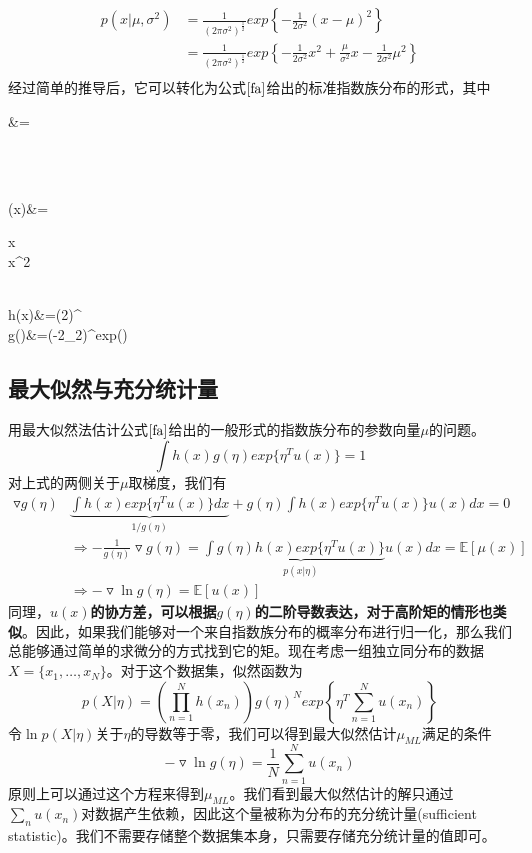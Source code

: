 \begin{enumerate}
\begin{equation}
\begin{aligned}
		p(x|\mu,\sigma^2)&=\frac{1}{(2\pi\sigma^2)^{\frac{1}{2}}}exp\left\{-\frac{1}{2\sigma^2}(x-\mu)^2 \right\}\\
		&=\frac{1}{(2\pi\sigma^2)^{\frac{1}{2}}}exp\left\{-\frac{1}{2\sigma^2}x^2+\frac{\mu}{\sigma^2}x-\frac{1}{2\sigma^2}\mu^2 \right\}\\
		\end{aligned}
	\end{equation}
	经过简单的推导后，它可以转化为公式$\ref{fa}$给出的标准指数族分布的形式，其中
	\begin{flalign}
		\eta&=\begin{pmatrix}
		\\
		\end{pmatrix}\\
		\mu(x)&=\begin{pmatrix}
		x\\x^2
		\end{pmatrix}\\
		h(x)&=(2\pi)^{}\\
		g(\eta)&=(-2\eta_2)^{}exp\left(\right)
	\end{flalign}
\end{enumerate}
\subsection*{最大似然与充分统计量}
用最大似然法估计公式$\ref{fa}$给出的一般形式的指数族分布的参数向量$\mu$的问题。
\begin{equation}
	\int h(x)g(\eta)exp\{\eta^Tu(x)\}=1
\end{equation}
对上式的两侧关于$\mu$取梯度，我们有
\begin{equation}
	\begin{aligned}
	\triangledown g(\eta)&\underbrace{\int h(x)exp\{\eta^Tu(x) \}dx}_{1/g(\eta)}+g(\eta)\int h(x)exp\{\eta^Tu(x) \}u(x)dx=0
	\\
	&\Rightarrow -\frac{1}{g(\eta)}\triangledown g(\eta)=\int \underbrace{g(\eta) h(x)exp\{\eta^Tu(x) \}}_{p(x|\eta)}u(x)dx=\mathbb{E}[\mu(x)]\\
	&\Rightarrow -\triangledown \ln g(\eta)=\mathbb{E}[u(x)]
	\end{aligned}
\end{equation}
同理，\textbf{$u(x)$的协方差，可以根据$g(\eta)$的二阶导数表达，对于高阶矩的情形也类似}。因此，如果我们能够对一个来自指数族分布的概率分布进行归一化，那么我们总能够通过简单的求微分的方式找到它的矩。现在考虑一组独立同分布的数据$X=\{x_1,\dots,x_N \}$。对于这个数据集，似然函数为
\begin{equation}
	p(X|\eta)=\left(\prod_{n=1}^{N}h(x_n) \right)g(\eta )^Nexp\left\{\eta^T\sum_{n=1}^{N}u(x_n) \right\}
\end{equation}
令$\ln p(X|\eta)$关于$\eta$的导数等于零，我们可以得到最大似然估计$\mu_{ML}$满足的条件
\begin{equation}
	-\triangledown \ln g(\eta)=\frac{1}{N}\sum_{n=1}^{N}u(x_n)
\end{equation}
原则上可以通过这个方程来得到$\mu_{ML}$。我们看到最大似然估计的解只通过$\sum_{n}u(x_n)$对数据产生依赖，因此这个量被称为分布的充分统计量(sufficient statistic)。我们不需要存储整个数据集本身，只需要存储充分统计量的值即可。
